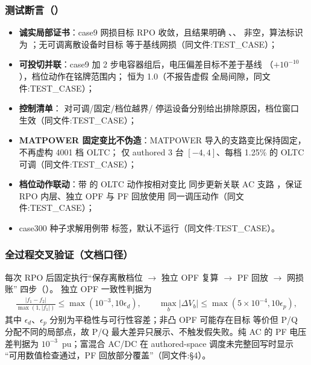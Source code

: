\subsubsection*{测试断言（）}
\begin{itemize}
  \item \textbf{诚实局部证书}：case9 网损目标 RPO 收敛，且结果明确
        、、
         非空，算法标识为
        ；无可调离散设备时目标
        等于基线网损（同文件:TEST\_CASE）；
  \item \textbf{可投切并联}：case9 加 2 步电容器组后，电压偏差目标不差于基线
        （$+10^{-10}$），档位动作在铭牌范围内； 恒为 1.0（不报告虚假
        全局间隙，同文件:TEST\_CASE）；
  \item \textbf{控制清单}： 对可调/固定/档位越界/
        停运设备分别给出排除原因，档位窗口  生效（同文件:TEST\_CASE）；
  \item \textbf{MATPOWER 固定变比不伪造}：MATPOWER 导入的支路变比保持固定，
        不再虚构 4001 档 OLTC； 仅 authored 3 台
        $[-4,4]$、每档 1.25\% 的 OLTC 可调（同文件:TEST\_CASE）；
  \item \textbf{档位动作联动}：带  的 OLTC 动作按相对变比
        同步更新关联 AC 支路 ，保证 RPO 内层、独立 OPF 与 PF 回放使用
        同一调压动作（同文件:TEST\_CASE）；
  \item case300 种子求解用例带 \fld{[.performance]} 标签，默认不运行（同文件:TEST\_CASE）。
\end{itemize}

\subsubsection*{全过程交叉验证（文档口径）}
每次 RPO 后固定执行“保存离散档位 $\to$ 独立 OPF 复算 $\to$ PF 回放 $\to$ 网损账”
四步（）。
独立 OPF 一致性判据为
\begin{align*}
\frac{|f_1-f_2|}{\max(1,|f_1|)}\le\max(10^{-3},10\epsilon_d),\qquad
\max_b|\Delta V_b|\le\max(5\times10^{-4},10\epsilon_p),
\end{align*}
其中 $\epsilon_d$、$\epsilon_p$ 分别为平稳性与可行性容差；非凸 OPF 可能存在目标
等价但 P/Q 分配不同的局部点，故 P/Q 最大差异只展示、不触发假失败。纯 AC 的 PF
电压差判据为 $10^{-3}$~pu；富混合 AC/DC 在 authored-space 调度未完整回写时显示
“可用数值检查通过，PF 回放部分覆盖”（同文件:§4）。

